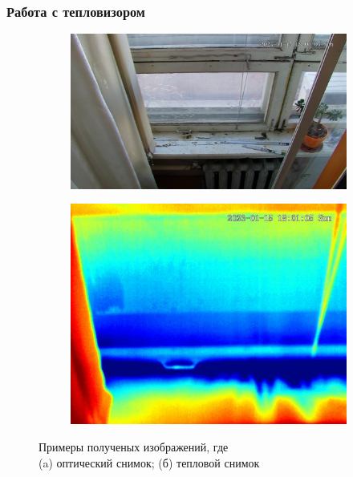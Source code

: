 \documentclass[t]{beamer}
\begin{document}
	\begin{frame}
		\frametitle{Работа с тепловизором}
		\vspace{1cm}
		\begin{figure}[ht!]
			\begin{subfigure}{0.5\textwidth}
				\centering
				\includegraphics[width = \textwidth]{image/chapter_2/opt_example}
				\caption{}
			\end{subfigure}
			\begin{subfigure}{0.3\textwidth}
				\centering
				\includegraphics[width = \textwidth]{image/chapter_2/tep_example}
				\caption{}
			\end{subfigure}
			\centering
			\caption{Примеры полученых изображений, где \\(a) оптический снимок; (б) тепловой снимок}
			\label{fig:Examples}
		\end{figure}
	\end{frame}
\end{document}
